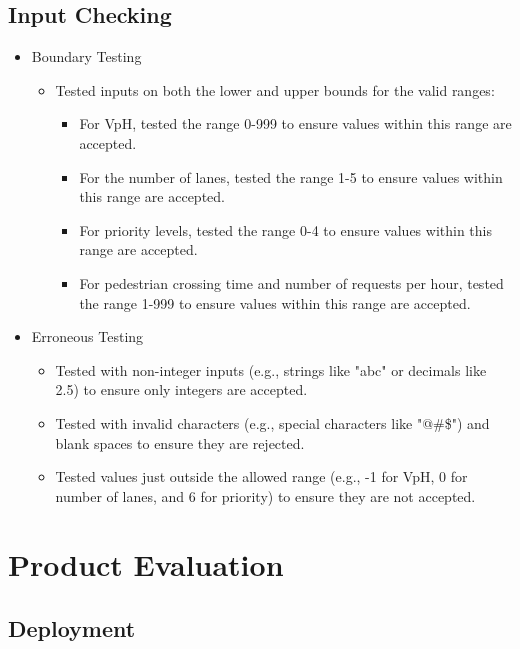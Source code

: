 \documentclass{article}
\begin{document}
    \subsection{Input Checking}

        \begin{itemize}
            \item Boundary Testing
            \begin{itemize}
                \item Tested inputs on both the lower and upper bounds for the valid ranges:
                \begin{itemize}
                    \item For VpH, tested the range 0-999 to ensure values within this range are accepted.
                    \item For the number of lanes, tested the range 1-5 to ensure values within this range are accepted.
                    \item For priority levels, tested the range 0-4 to ensure values within this range are accepted.
                    \item For pedestrian crossing time and number of requests per hour, tested the range 1-999 to ensure values within this range are accepted.
                \end{itemize}
            \end{itemize}
            \item Erroneous Testing
            \begin{itemize}
                \item Tested with non-integer inputs (e.g., strings like "abc" or decimals like 2.5) to ensure only integers are accepted.
                \item Tested with invalid characters (e.g., special characters like "@\#\$") and blank spaces to ensure they are rejected.
                \item Tested values just outside the allowed range (e.g., -1 for VpH, 0 for number of lanes, and 6 for priority) to ensure they are not accepted.
            \end{itemize}
        \end{itemize}    

\section{Product Evaluation}

    \subsection{Deployment}
\end{document}
